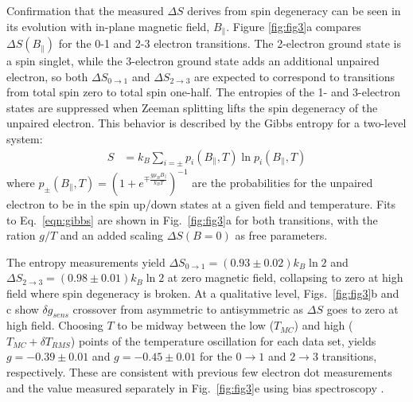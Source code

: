 \documentclass[twocolumn,showpacs,amsmath,amssymb,prl,aps,superscriptaddress]{revtex4-1}
\begin{document}
Confirmation that the measured $\Delta S$ derives from spin degeneracy can be seen in its evolution with in-plane magnetic field, $B_\parallel$. Figure \ref{fig:fig3}a compares $\Delta S(B_\parallel)$ for the 0-1 and 2-3 electron transitions.  The 2-electron ground state is a spin singlet, while the 3-electron ground state adds an additional unpaired electron, so both $\Delta S_{0 \rightarrow 1}$ and $\Delta S_{2 \rightarrow 3}$ are expected to correspond to transitions from total spin zero to total spin one-half. The entropies of the 1- and 3-electron states are suppressed when Zeeman splitting lifts the spin degeneracy of the unpaired electron. This behavior is described by the Gibbs entropy for a two-level system:
%
\begin{align}
\label{eqn:gibbs}
        S &= k_B \sum_{i=\pm} p_{i}(B_\parallel, T) \ln{ p_{i}(B_\parallel,T) }
\end{align}
%
where $p_{\pm}(B_\parallel, T) = (1+ e^{\mp \frac{g\mu_B B_{\parallel}}{k_B T}})^{-1}$ are the probabilities for the unpaired electron to be in the spin up/down states at a given field and temperature. Fits to Eq.~\ref{eqn:gibbs} are shown in Fig.~\ref{fig:fig3}a for both transitions, with the ration $g/T$ and an added scaling $\Delta S(B=0)$ as free parameters.

The entropy measurements yield $\Delta S_{0 \rightarrow 1}=(0.93 \pm 0.02) k_B \ln{2}$ and $\Delta S_{2 \rightarrow 3}=(0.98 \pm 0.01) k_B \ln{2}$ at zero magnetic field, collapsing to zero at high field where spin degeneracy is broken.  At a qualitative level, Figs.~\ref{fig:fig3}b and c show $\delta g_{sens}$ crossover from asymmetric to antisymmetric as $\Delta S$ goes to zero at high field. Choosing $T$ to be midway between the low ($T_{MC}$) and high ($T_{MC}+\delta T_{RMS}$) points of the temperature oscillation for each data set, yields $g=-0.39 \pm 0.01 $ and $g=-0.45 \pm 0.01 $ for the $0\rightarrow 1$ and $2\rightarrow 3$ transitions, respectively. These are consistent with previous few electron dot measurements and the value measured separately in Fig.~\ref{fig:fig3}e using bias spectroscopy \cite{Cronenwett1998,Hanson2003,Zumbuhl2004}.
\end{document}
